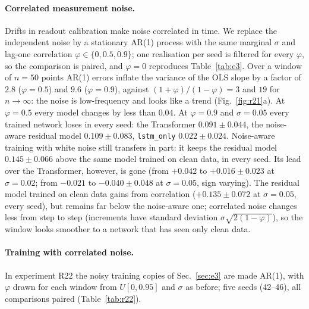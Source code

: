 \documentclass[twocolumn,10pt]{article}
\begin{document}
\paragraph{Correlated measurement noise.}
Drifts in readout calibration make noise correlated in time. We replace
the independent noise by a stationary AR(1) process with the same
marginal $\sigma$ and lag-one correlation $\varphi \in \{0, 0.5, 0.9\}$;
one realisation per seed is filtered for every $\varphi$, so the
comparison is paired, and $\varphi = 0$ reproduces Table~\ref{tab:e3}.
Over a window of $n = 50$ points AR(1) errors inflate the variance of the
OLS slope by a factor of $2.8$ ($\varphi = 0.5$) and $9.6$
($\varphi = 0.9$), against $(1+\varphi)/(1-\varphi) = 3$ and $19$ for
$n \to \infty$: the noise is low-frequency and looks like a trend
(Fig.~\ref{fig:r21}a).
At $\varphi = 0.5$ every model changes by less than $0.04$.
At $\varphi = 0.9$ and $\sigma = 0.05$ every trained network loses in
every seed: the Transformer $0.091 \pm 0.044$, the noise-aware residual
model $0.109 \pm 0.083$, \texttt{lstm\_only} $0.022 \pm 0.024$.
Noise-aware training with white noise still transfers in part: it keeps
the residual model $0.145 \pm 0.066$ above the same model trained on
clean data, in every seed. Its lead over the Transformer, however, is
gone (from $+0.042$ to $+0.016 \pm 0.023$ at $\sigma = 0.02$; from
$-0.021$ to $-0.040 \pm 0.048$ at $\sigma = 0.05$, sign varying).
The residual model trained on clean data gains from correlation
($+0.135 \pm 0.072$ at $\sigma = 0.05$, every seed), but remains far
below the noise-aware one; correlated noise changes less from step to
step (increments have standard deviation $\sigma\sqrt{2(1-\varphi)}$), so
the window looks smoother to a network that has seen only clean data.

\paragraph{Training with correlated noise.}
In experiment R22 the noisy training copies of Sec.~\ref{sec:e3} are made
AR(1), with $\varphi$ drawn for each window from $U[0, 0.95]$ and
$\sigma$ as before; five seeds (42--46), all comparisons paired
(Table~\ref{tab:r22}).
\end{document}
